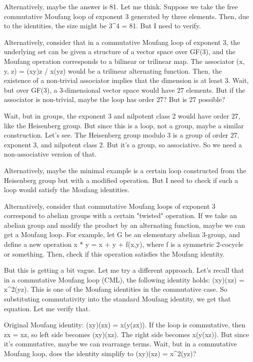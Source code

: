 \documentclass[12p]{article}
\newcounter{reasoningcounter}
\newenvironment{reasoning}[1][]
{\refstepcounter{reasoningcounter}%
\begin{tcolorbox}[
    title=Reasoning \thereasoningcounter: #1,
    colback=white, %
    colframe=gray,
    coltext=black, %
    fonttitle=\bfseries\normalsize,
    top=2mm,
    bottom=2mm,
    enlarge top initially by=5mm
]
\small
}
{\end{tcolorbox}}
\begin{document}
\begin{reasoning}
Alternatively, maybe the answer is 81. Let me think. Suppose we take the free commutative Moufang loop of exponent 3 generated by three elements. Then, due to the identities, the size might be 3^4 = 81. But I need to verify.

Alternatively, consider that in a commutative Moufang loop of exponent 3, the underlying set can be given a structure of a vector space over GF(3), and the Moufang operation corresponds to a bilinear or trilinear map. The associator (x, y, z) = (xy)z / x(yz) would be a trilinear alternating function. Then, the existence of a non-trivial associator implies that the dimension is at least 3. Wait, but over GF(3), a 3-dimensional vector space would have 27 elements. But if the associator is non-trivial, maybe the loop has order 27? But is 27 possible?

Wait, but in groups, the exponent 3 and nilpotent class 2 would have order 27, like the Heisenberg group. But since this is a loop, not a group, maybe a similar construction. Let's see. The Heisenberg group modulo 3 is a group of order 27, exponent 3, and nilpotent class 2. But it's a group, so associative. So we need a non-associative version of that.

Alternatively, maybe the minimal example is a certain loop constructed from the Heisenberg group but with a modified operation. But I need to check if such a loop would satisfy the Moufang identities.

Alternatively, consider that commutative Moufang loops of exponent 3 correspond to abelian groups with a certain "twisted" operation. If we take an abelian group and modify the product by an alternating function, maybe we can get a Moufang loop. For example, let G be an elementary abelian 3-group, and define a new operation x * y = x + y + f(x,y), where f is a symmetric 2-cocycle or something. Then, check if this operation satisfies the Moufang identity.

But this is getting a bit vague. Let me try a different approach. Let's recall that in a commutative Moufang loop (CML), the following identity holds: (xy)(xz) = x^2(yz). This is one of the Moufang identities in the commutative case. So substituting commutativity into the standard Moufang identity, we get that equation. Let me verify that.

Original Moufang identity: (xy)(zx) = x(y(zx)). If the loop is commutative, then zx = xz, so left side becomes (xy)(xz). The right side becomes x(y(xz)). But since it's commutative, maybe we can rearrange terms. Wait, but in a commutative Moufang loop, does the identity simplify to (xy)(xz) = x^2(yz)?


\end{reasoning}
\end{document}
